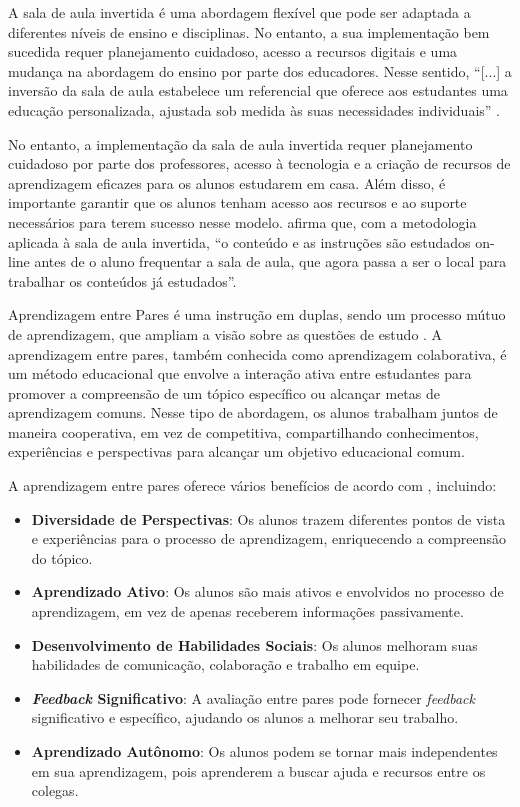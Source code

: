 A sala de aula invertida é uma abordagem flexível que pode ser adaptada a diferentes níveis de ensino e disciplinas. No entanto, a sua implementação bem sucedida requer planejamento cuidadoso, acesso a recursos digitais e uma mudança na abordagem do ensino por parte dos educadores. Nesse sentido, ``[...] a inversão da sala de aula estabelece um referencial que oferece aos estudantes uma educação personalizada, ajustada sob medida às suas necessidades individuais'' \cite[p. 22]{BERGMANNSANS2016}.

No entanto, a implementação da sala de aula invertida requer planejamento cuidadoso por parte dos professores, acesso à tecnologia e a criação de recursos de aprendizagem eficazes para os alunos estudarem em casa. Além disso, é importante garantir que os alunos tenham acesso aos recursos e ao suporte necessários para terem sucesso nesse modelo.  afirma que, com a metodologia aplicada à sala de aula invertida, ``o conteúdo e as instruções são estudados on-line antes de o aluno frequentar a sala de aula, que agora passa a ser o local para trabalhar os conteúdos já estudados''.

Aprendizagem entre Pares é uma instrução em duplas, sendo um processo mútuo de aprendizagem, que ampliam a visão sobre as questões de estudo \cite{BACICHMORAN2018}. A aprendizagem entre pares, também conhecida como aprendizagem colaborativa, é um método educacional que envolve a interação ativa entre estudantes para promover a compreensão de um tópico específico ou alcançar metas de aprendizagem comuns. Nesse tipo de abordagem, os alunos trabalham juntos de maneira cooperativa, em vez de competitiva, compartilhando conhecimentos, experiências e perspectivas para alcançar um objetivo educacional comum.

A aprendizagem entre pares oferece vários benefícios de acordo com , incluindo:

\begin{itemize}
    \item \textbf{Diversidade de Perspectivas}: Os alunos trazem diferentes pontos de vista e experiências para o processo de aprendizagem, enriquecendo a compreensão do tópico.
    \item \textbf{Aprendizado Ativo}: Os alunos são mais ativos e envolvidos no processo de aprendizagem, em vez de apenas receberem informações passivamente.
    \item \textbf{Desenvolvimento de Habilidades Sociais}: Os alunos melhoram suas habilidades de comunicação, colaboração e trabalho em equipe.
    \item \textbf{\textit{Feedback} Significativo}: A avaliação entre pares pode fornecer \textit{feedback} significativo e específico, ajudando os alunos a melhorar seu trabalho.
    \item \textbf{Aprendizado Autônomo}: Os alunos podem se tornar mais independentes em sua aprendizagem, pois aprenderem a buscar ajuda e recursos entre os colegas.
\end{itemize}

